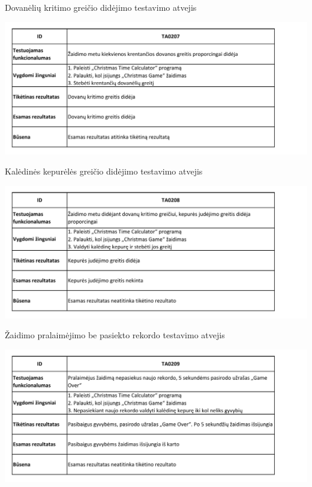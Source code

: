\documentclass{VUMIFPSkursinis}
\begin{document}
				\begin{table}[H]
					\centering
					\caption{Dovanėlių kritimo greičio didėjimo testavimo atvejis}
					\includegraphics[width=\textwidth]{TA/TA0207}			
					\label{fig:TA0207}
				\end{table}
				\begin{table}[H]
					\centering
					\caption{Kalėdinės kepurėlės greičio didėjimo testavimo atvejis}
					\includegraphics[width=\textwidth]{TA/TA0208}			
					\label{fig:TA0208}
				\end{table}
				\begin{table}[H]
					\centering
					\caption{Žaidimo pralaimėjimo be pasiekto rekordo testavimo atvejis}
					\includegraphics[width=\textwidth]{TA/TA0209}			
					\label{fig:TA0209}
				\end{table}
\end{document}
